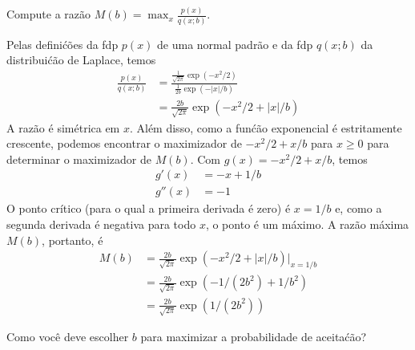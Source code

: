 \begin{exenumerate}
    \item Compute a raz\~ao $M(b) = \max_x \frac{p(x)}{q(x; b)}$.
    \begin{solution}
        Pelas defini\'c\~oes da fdp $p(x)$ de uma normal padr\~ao e da fdp $q(x; b)$ da distribui\'c\~ao de Laplace, temos
        \begin{align}
            \frac{p(x)}{q(x;b)} &= \frac{ \frac{1}{\sqrt{2\pi}} \exp(-x^2/2)}{\frac{1}{2b}\exp(-|x|/b)}\\
            & = \frac{2b}{\sqrt{2\pi}} \exp(-x^2/2 + |x|/b)
        \end{align}
        A raz\~ao \'e sim\'etrica em $x$. Al\'em disso, como a fun\'c\~ao
        exponencial \'e estritamente crescente, podemos encontrar o maximizador de
        $-x^2/2+x/b$ para $x\ge 0$ para determinar o maximizador de
        $M(b)$. Com $g(x) = -x^2/2+x/b$, temos
        \begin{align}
            g'(x) &= -x + 1/b\\
            g''(x) &= -1
        \end{align}
        O ponto cr\'itico (para o qual a primeira derivada \'e zero) \'e $x = 1/b$ e, como a segunda derivada \'e negativa para todo $x$, o ponto \'e um m\'aximo. A raz\~ao m\'axima $M(b)$, portanto, \'e
        \begin{align}
            M(b)  & = \frac{2b}{\sqrt{2\pi}} \exp\left(-x^2/2 + |x|/b\right)\Big|_{x=1/b}\\
            & = \frac{2b}{\sqrt{2\pi}} \exp\left(-1/(2b^2) + 1/b^2\right)\\
            & = \frac{2b}{\sqrt{2\pi}} \exp\left(1/(2b^2)\right)
        \end{align}
    \end{solution}
    
    \item Como voc\^e deve escolher $b$ para maximizar a probabilidade de aceita\'c\~ao?
    

\end{exenumerate}
